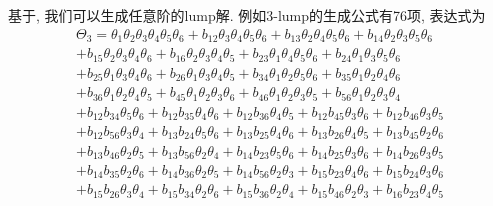 基于, 我们可以生成任意阶的lump解. 例如3-lump的生成公式有76项, 表达式为
\begin{equation}
\renewcommand{\arraystretch}{0.8} 
\begin{array}{l}
\Theta_3=\theta_{{1}}\theta_{{2}}\theta_{{3}}\theta_{{4}}\theta_{{5}}\theta_{{6}}
+b_{{12}}\theta_{{3}}\theta_{{4}}\theta_{{5}}\theta_{{6}}
+b_{{13}}\theta_{{2}}\theta_{{4}}\theta_{{5}}\theta_{{6}}
+b_{{14}}\theta_{{2}}\theta_{{3}}\theta_{{5}}\theta_{{6}}\\
+b_{{15}}\theta_{{2}}\theta_{{3}}\theta_{{4}}\theta_{{6}}
+b_{{16}}\theta_{{2}}\theta_{{3}}\theta_{{4}}\theta_{{5}}
+b_{{23}}\theta_{{1}}\theta_{{4}}\theta_{{5}}\theta_{{6}}
+b_{{24}}\theta_{{1}}\theta_{{3}}\theta_{{5}}\theta_{{6}}\\
+b_{{25}}\theta_{{1}}\theta_{{3}}\theta_{{4}}\theta_{{6}}
+b_{{26}}\theta_{{1}}\theta_{{3}}\theta_{{4}}\theta_{{5}}
+b_{{34}}\theta_{{1}}\theta_{{2}}\theta_{{5}}\theta_{{6}}
+b_{{35}}\theta_{{1}}\theta_{{2}}\theta_{{4}}\theta_{{6}}\\
+b_{{36}}\theta_{{1}}\theta_{{2}}\theta_{{4}}\theta_{{5}}
+b_{{45}}\theta_{{1}}\theta_{{2}}\theta_{{3}}\theta_{{6}}
+b_{{46}}\theta_{{1}}\theta_{{2}}\theta_{{3}}\theta_{{5}}
+b_{{56}}\theta_{{1}}\theta_{{2}}\theta_{{3}}\theta_{{4}}\\
+b_{{12}}b_{{34}}\theta_{{5}}\theta_{{6}}
+b_{{12}}b_{{35}}\theta_{{4}}\theta_{{6}}
+b_{{12}}b_{{36}}\theta_{{4}}\theta_{{5}}
+b_{{12}}b_{{45}}\theta_{{3}}\theta_{{6}}
+b_{{12}}b_{{46}}\theta_{{3}}\theta_{{5}}\\
+b_{{12}}b_{{56}}\theta_{{3}}\theta_{{4}}
+b_{{13}}b_{{24}}\theta_{{5}}\theta_{{6}}
+b_{{13}}b_{{25}}\theta_{{4}}\theta_{{6}}
+b_{{13}}b_{{26}}\theta_{{4}}\theta_{{5}}
+b_{{13}}b_{{45}}\theta_{{2}}\theta_{{6}}\\
+b_{{13}}b_{{46}}\theta_{{2}}\theta_{{5}}
+b_{{13}}b_{{56}}\theta_{{2}}\theta_{{4}}
+b_{{14}}b_{{23}}\theta_{{5}}\theta_{{6}}
+b_{{14}}b_{{25}}\theta_{{3}}\theta_{{6}}
+b_{{14}}b_{{26}}\theta_{{3}}\theta_{{5}}\\
+b_{{14}}b_{{35}}\theta_{{2}}\theta_{{6}}
+b_{{14}}b_{{36}}\theta_{{2}}\theta_{{5}}
+b_{{14}}b_{{56}}\theta_{{2}}\theta_{{3}}
+b_{{15}}b_{{23}}\theta_{{4}}\theta_{{6}}
+b_{{15}}b_{{24}}\theta_{{3}}\theta_{{6}}\\
+b_{{15}}b_{{26}}\theta_{{3}}\theta_{{4}}
+b_{{15}}b_{{34}}\theta_{{2}}\theta_{{6}}
+b_{{15}}b_{{36}}\theta_{{2}}\theta_{{4}}
+b_{{15}}b_{{46}}\theta_{{2}}\theta_{{3}}
+b_{{16}}b_{{23}}\theta_{{4}}\theta_{{5}}\\

\end{array}
\end{equation}
